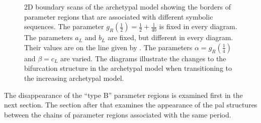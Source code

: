 \begin{figure}
{		\label{fig:add.change.regions.3}
	}
	\caption[Changes to the bifurcation structures of the archetypal model during its transition to the increasing archetypal model]{
		2D boundary scans of the archetypal model showing the borders of parameter regions that are associated with different symbolic sequences.
		The parameter $g_R\left(\frac{1}{2}\right) = \frac{1}{2} + \frac{1}{40}$ is fixed in every diagram.
		The parameters $a_L$ and $b_L$ are fixed, but different in every diagram.
		Their values are on the line given by .
		The parameters $\alpha = g_R\left(\frac{1}{4}\right)$ and $\beta = c_L$ are varied.
		The diagrams illustrate the changes to the bifurcation structure in the archetypal model when transitioning to the increasing archetypal model.
	}
	\label{fig:add.change.regions}
\end{figure}


The disappearance of the ``type B'' parameter regions is examined first in the next section.
The section after that examines the appearance of the \gls{pal} structures between the chains of parameter regions associated with the same period.




